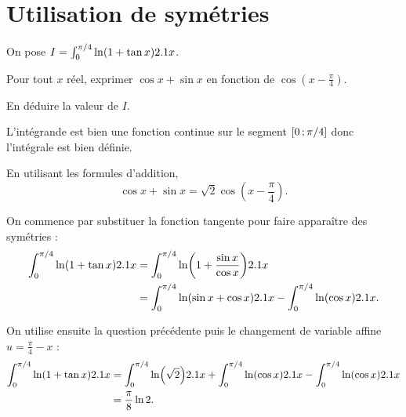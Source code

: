 \section{Utilisation de symétries}


\begin{exercice}
On pose $I = \int_0^{\pi/4} \ln(1+\tan x) 2.1 x$.
\begin{questions}
\item Pour tout $x$ réel, exprimer $\cos x + \sin x$ en fonction de $\cos\mathopen{}\left(x - \frac{\pi}{4}\right)$.

\item En déduire la valeur de $I$.
\end{questions}
\end{exercice}

\begin{elemsolution}
L'intégrande est bien une fonction continue sur le segment $\left[0\,;\pi/4\right]$ donc l'intégrale est bien définie.
\begin{reponses}
\item En utilisant les formules d'addition,
\[
\cos x + \sin x = \sqrt{2} \cos\mathopen{}\left(x-\frac{\pi}{4}\right).
\]

\item On commence par substituer la fonction tangente pour faire apparaître des symétries :
\begin{align*}
\int_0^{\pi/4} \ln(1+\tan x) 2.1 x &= \int_0^{\pi/4} \ln(1+\frac{\sin x}{\cos x}) 2.1 x\\
 &= \int_0^{\pi/4} \ln(\sin x+\cos x) 2.1 x - \int_0^{\pi/4} \ln(\cos x)2.1 x.
\end{align*}

On utilise ensuite la question précédente puis le changement de variable affine $u = \frac{\pi}{4} - x$ :
\begin{align*}
\int_0^{\pi/4} \ln(1+\tan x) 2.1 x &= \int_0^{\pi/4} \ln (\sqrt{2}) 2.1 x + \int_0^{\pi/4} \ln(\cos x) 2.1 x - \int_0^{\pi/4} \ln(\cos x) 2.1 x\\
&= \frac{\pi}{8} \ln 2.
\end{align*}
\end{reponses}
\end{elemsolution}

\begin{marginfigure}[0cm]
    
\end{marginfigure}

